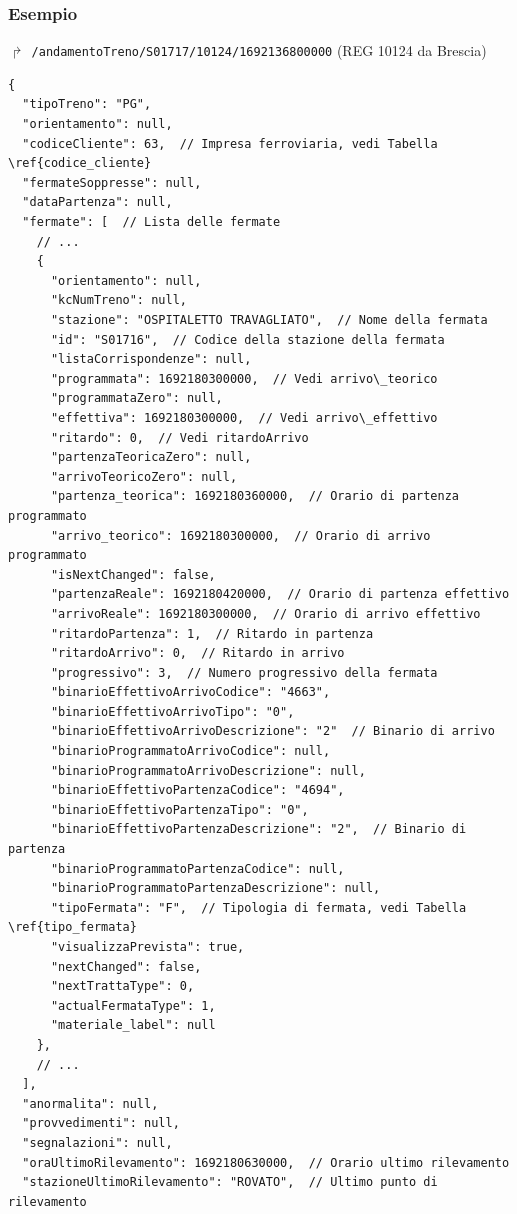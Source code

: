\documentclass[12pt,a4paper,italian]{report}
\begin{document}
\subsubsection{Esempio}

$\Rsh$ \texttt{/andamentoTreno/S01717/10124/1692136800000} \hfill (REG
10124 da Brescia)

\begin{verbatim}
{
  "tipoTreno": "PG",
  "orientamento": null,
  "codiceCliente": 63,  // Impresa ferroviaria, vedi Tabella \ref{codice_cliente}
  "fermateSoppresse": null,
  "dataPartenza": null,
  "fermate": [  // Lista delle fermate
    // ...
    {
      "orientamento": null,
      "kcNumTreno": null,
      "stazione": "OSPITALETTO TRAVAGLIATO",  // Nome della fermata
      "id": "S01716",  // Codice della stazione della fermata
      "listaCorrispondenze": null,
      "programmata": 1692180300000,  // Vedi arrivo\_teorico
      "programmataZero": null,
      "effettiva": 1692180300000,  // Vedi arrivo\_effettivo
      "ritardo": 0,  // Vedi ritardoArrivo
      "partenzaTeoricaZero": null,
      "arrivoTeoricoZero": null,
      "partenza_teorica": 1692180360000,  // Orario di partenza programmato
      "arrivo_teorico": 1692180300000,  // Orario di arrivo programmato
      "isNextChanged": false,
      "partenzaReale": 1692180420000,  // Orario di partenza effettivo
      "arrivoReale": 1692180300000,  // Orario di arrivo effettivo
      "ritardoPartenza": 1,  // Ritardo in partenza
      "ritardoArrivo": 0,  // Ritardo in arrivo
      "progressivo": 3,  // Numero progressivo della fermata
      "binarioEffettivoArrivoCodice": "4663",
      "binarioEffettivoArrivoTipo": "0",
      "binarioEffettivoArrivoDescrizione": "2"  // Binario di arrivo
      "binarioProgrammatoArrivoCodice": null,
      "binarioProgrammatoArrivoDescrizione": null,
      "binarioEffettivoPartenzaCodice": "4694",
      "binarioEffettivoPartenzaTipo": "0",
      "binarioEffettivoPartenzaDescrizione": "2",  // Binario di partenza
      "binarioProgrammatoPartenzaCodice": null,
      "binarioProgrammatoPartenzaDescrizione": null,
      "tipoFermata": "F",  // Tipologia di fermata, vedi Tabella \ref{tipo_fermata}
      "visualizzaPrevista": true,
      "nextChanged": false,
      "nextTrattaType": 0,
      "actualFermataType": 1,
      "materiale_label": null
    },
    // ...
  ],
  "anormalita": null,
  "provvedimenti": null,
  "segnalazioni": null,
  "oraUltimoRilevamento": 1692180630000,  // Orario ultimo rilevamento
  "stazioneUltimoRilevamento": "ROVATO",  // Ultimo punto di rilevamento

\end{verbatim}
\end{document}
